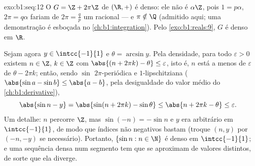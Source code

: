 \begin{solution}{exo:b1:seq:12}
O  $G = \Z + 2\pi\Z$ de $(\R, +)$ é denso: ele não é
$\alpha\Z$, pois $1 = p\alpha$, $2\pi = q\alpha$ fariam de $2\pi =
\frac qp$ um racional --- e $\pi \notin \Q$ (admitido aqui; uma demonstração
é esboçada no \cref{ch:b1:integration}). Pelo \cref{exo:b1:reals:9}, $G$
é denso em $\R$.

Sejam agora $y \in \intcc{-1}{1}$ e $\theta = \arcsin y$. Pela densidade,
para todo $\varepsilon > 0$ existem $n \in \Z$, $k \in \Z$ com
$\abs{(n + 2\pi k) - \theta} \leq \varepsilon$, isto é, $n$ está a menos de
$\varepsilon$ de $\theta - 2\pi k$; então, sendo $\sin$
$2\pi$-periódica e $1$-lipschitziana ($\abs{\sin a - \sin b} \leq
\abs{a - b}$, pela desigualdade do valor médio do
\cref{ch:b1:derivative}),
\[
\abs{\sin n - y} = \abs{\sin(n + 2\pi k) - \sin\theta}
\leq \abs{n + 2\pi k - \theta} \leq \varepsilon .
\]
Um detalhe: $n$ percorre $\Z$, mas $\sin(-n) = -\sin n$ e $y$
era arbitrário em $\intcc{-1}{1}$, de modo que índices não negativos
bastam (troque $(n, y)$ por $(-n, -y)$ se necessário). Portanto, $\{\sin n : n \in
\N\}$ é denso em $\intcc{-1}{1}$; e uma sequência densa num
segmento tem  que se aproximam de valores distintos, de
sorte que ela diverge.
\end{solution}


